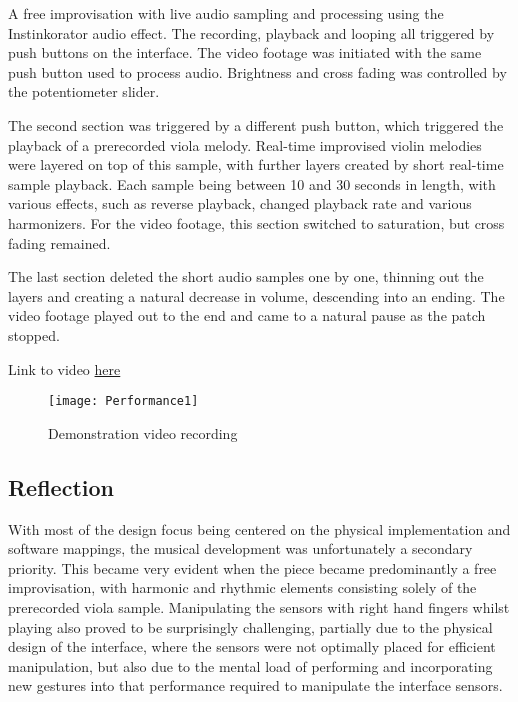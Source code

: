\documentclass{nime-alternate}
\begin{document}
A free improvisation with live audio sampling and processing using the Instinkorator audio effect. The recording, playback and looping all triggered by push buttons on the interface. The video footage was initiated with the same push button used to process audio. Brightness and cross fading was controlled by the potentiometer slider.

The second section was triggered by a different push button, which triggered the playback of a prerecorded viola melody. Real-time improvised violin melodies were layered on top of this sample, with further layers created by short real-time sample playback. Each sample being between 10 and 30 seconds in length, with various effects, such as reverse playback, changed playback rate and various harmonizers. For the video footage, this section switched to saturation, but cross fading remained. 

The last section deleted the short audio samples one by one, thinning out the layers and creating a natural decrease in volume, descending into an ending. The video footage played out to the end and came to a natural pause as the patch stopped. 

Link to video
\href{https://www.dropbox.com/s/yk6e073fcjxtjfu/NIME_demo.mp4?dl=0}{here} 


\begin{figure}[t]
	\centering
		\texttt{[image: Performance1]}
	\caption{Demonstration video recording}
	\label{fig:Performance1}
\end{figure}

\subsection{Reflection}

With most of the design focus being centered on the physical implementation and software mappings, the musical development was unfortunately a secondary priority. This became very evident when the piece became predominantly a free improvisation, with harmonic and rhythmic elements consisting solely of the prerecorded viola sample. Manipulating the sensors with right hand fingers whilst playing also proved to be surprisingly challenging, partially due to the physical design of the interface, where the sensors were not optimally placed for efficient manipulation, but also due to the mental load of performing and incorporating new gestures into that performance required to manipulate the interface sensors. 
\end{document}
